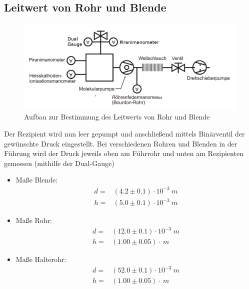 \documentclass[12pt, a4paper]{scrartcl}
\begin{document}
    
    \subsection{Leitwert von Rohr und Blende}
    
        \begin{figure}[H]
            \centering
            \includegraphics[width=.55\paperwidth]{aufbau24.png}
            \caption{Aufbau zur Bestimmung des Leitwerts von Rohr und Blende}
            \label{fig:anord5}
        \end{figure}
    
    	Der Rezipient wird nun leer gepumpt und anschließend mittels Binärventil der gewünschte Druck eingestellt. Bei verschiedenen Rohren und Blenden in der Führung wird der Druck jeweils oben am Führrohr und unten am Rezipienten gemessen (mithilfe der Dual-Gauge)
    	
    	\begin{itemize}
    		\item Maße Blende:
    			\begin{align*}
    				d=&(4.2\pm 0.1)\cdot 10^{-3}\ m\\
    				h=&(5.0\pm 0.1)\cdot 10^{-3}\ m
    			\end{align*}
    			
    		\item Maße Rohr:
    			\begin{align*}
    				d=&(12.0\pm 0.1)\cdot 10^{-3}\ m\\
    				h=&(1.00\pm 0.05)\cdot \ m
    			\end{align*}
    			
    		\item Maße Halterohr:
    			\begin{align*}
    				d=&(52.0\pm 0.1)\cdot 10^{-3}\ m\\
    				h=&(1.00\pm 0.05)\cdot \ m
    			\end{align*}
    	\end{itemize}
    
\end{document}
